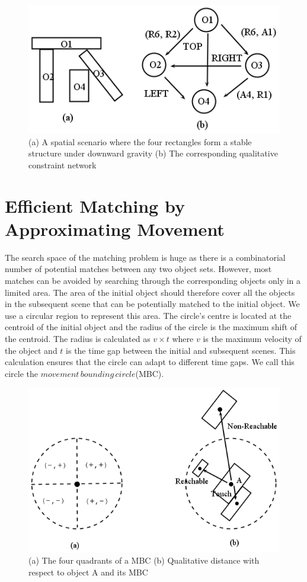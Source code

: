 \documentclass[letterpaper]{article}
\begin{document}
 \begin{figure}[h!]
\centering\includegraphics[scale=0.45]{QCN.png}\caption{(a) A spatial scenario where the four rectangles form a stable structure under downward gravity (b) The corresponding qualitative constraint network}
\label{QCN}
\end{figure}

\section{Efficient Matching by Approximating Movement}\label{approxM}

The search space of the matching problem is huge as there is a combinatorial number of potential matches between any two object sets. However, most matches can be avoided by searching through the corresponding objects only in a limited area. The area of the initial object should therefore cover all the objects in the subsequent scene that can be potentially matched to the initial object.  We use a circular region to represent this area. The circle's centre is located at the centroid of the initial object and the radius of the circle is the maximum shift of the centroid. The radius is calculated as $v \times t$ where $v$ is the maximum velocity of the object and $t$ is the time gap between the initial and subsequent scenes. This calculation ensures that the circle can adapt to different time gaps. We call this circle the $movement\,bounding\,circle$(MBC).  
\begin{figure}[h!]
\centering\includegraphics[scale=0.3]{quadrants.png}\caption{(a) The four quadrants of a MBC (b) Qualitative distance with respect to object A and its MBC}
\label{Quadrants}
\end{figure}
\end{document}
